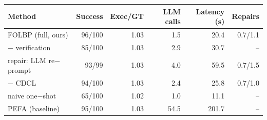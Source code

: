 \begin{tabular}{lrrrrr}
\toprule
Method & Success & Exec/GT & LLM calls & Latency (s) & Repairs \\
\midrule
FOLBP (full, ours) & 96/100 & 1.03 & 1.5 & 20.4 & 0.7/1.1 \\
$-$ verification & 85/100 & 1.03 & 2.9 & 30.7 & -- \\
repair: LLM re$-$prompt & 93/99 & 1.03 & 4.0 & 59.5 & 0.7/1.5 \\
$-$ CDCL & 94/100 & 1.03 & 2.4 & 25.8 & 0.7/1.0 \\
naive one$-$shot & 65/100 & 1.02 & 1.0 & 11.1 & -- \\
PEFA (baseline) & 95/100 & 1.03 & 54.5 & 201.7 & -- \\
\bottomrule
\end{tabular}
